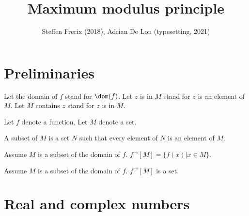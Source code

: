 \documentclass{article}
\title{Maximum modulus principle}
\author{Steffen Frerix (2018), Adrian De Lon (typesetting, 2021)}
\date{}
\newcommand{\image}[2]{#1^{\to}[#2]}
\begin{document}

  \maketitle


  \section{Preliminaries}

  \begin{forthel}

    Let the domain of $f$ stand for $\dom(f)$.
    Let $z$ is in $M$ stand for $z$ is an element of $M$.
    Let $M$ contains $z$ stand for $z$ is in $M$.

    Let $f$ denote a function.
    Let $M$ denote a set.

    \begin{definition}
      A subset of $M$ is a set $N$ such that
      every element of $N$ is an element of $M$.
    \end{definition}

    \begin{definition}
      Assume $M$ is a subset of the domain of $f$.
      $\image{f}{M} = \{ f(x) | x\in M \}$.
    \end{definition}

    \begin{axiom}
      Assume $M$ is a subset of the domain of $f$.
      $\image{f}{M}$ is a set.
    \end{axiom}
  \end{forthel}

    \section{Real and complex numbers}
\end{document}
